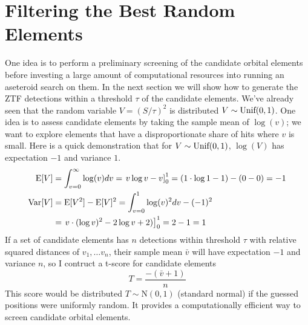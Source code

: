 \section{Filtering the Best Random Elements}
\label{section_best_random_elements}
One idea is to perform a preliminary screening of the candidate orbital elements 
before investing a large amount of computational resources into running an aseteroid search on them.
In the next section we will show how to generate the ZTF detections within a threshold $\tau$ of the candidate elements.
We've already seen that the random variable $V = (S/ \tau)^2$ is distributed $V \sim \textnormal{Unif}(0, 1)$.
One idea is to assess candidate elements by taking the sample mean of $\log(v)$;
we want to explore elements that have a disproportionate share of hits where $v$ is small.
Here is a quick demonstration that for $V \sim \textnormal{Unif}(0,1)$, $\log(V)$ has expectation $-1$ and variance $1$.
\begin{align*}
\mathrm{E}[ V ] &= \int_{v=0}^{\infty} \log (v) dv = \left. v \log v - v \right]_{0}^{1} = (1 \cdot \log 1 - 1) - (0 - 0) = -1 \\
\mathrm{Var}[V ] &= \mathrm{E}[V^2] - \mathrm{E}[V]^2 = \int_{v=0}^{1} \log(v)^2 dv - (-1)^2 \\
&= \left. v \cdot (\log v)^2 - 2 \log v + 2) \right]_{0}^{1} = 2 -1 = 1
\end{align*}
If a set of candidate elements has $n$ detections within threshold $\tau$ with relative squared distances of $v_1, \ldots v_n$,
their sample mean $\bar{v}$ will have expectation $-1$ and variance $n$, so I contruct a t-score for candidate elements
$$T = \frac{-(\bar{v} + 1)}{n}$$
This score would be distributed $T \sim \mathrm{N}(0, 1)$ (standard normal) if the guessed positions were uniformly random.
It provides a computationally efficient way to screen candidate orbital elements.


